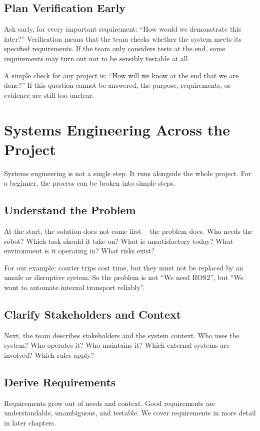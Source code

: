 \subsection{Plan Verification Early}
Ask early, for every important requirement: \enquote{How would we demonstrate this later?} Verification means that the team checks whether the system meets its specified requirements. If the team only considers tests at the end, some requirements may turn out not to be sensibly testable at all.

\begin{hinweisbox}
A simple check for any project is: \enquote{How will we know at the end that we are done?} If this question cannot be answered, the purpose, requirements, or evidence are still too unclear.
\end{hinweisbox}

\section{Systems Engineering Across the Project}
Systems engineering is not a single step. It runs alongside the whole project. For a beginner, the process can be broken into simple steps.

\subsection{Understand the Problem}
At the start, the solution does not come first -- the problem does. Who needs the robot? Which task should it take on? What is unsatisfactory today? What environment is it operating in? What risks exist?

For our example: courier trips cost time, but they must not be replaced by an unsafe or disruptive system. So the problem is not \enquote{We need ROS2}, but \enquote{We want to automate internal transport reliably}.

\subsection{Clarify Stakeholders and Context}
Next, the team describes stakeholders and the system context. Who uses the system? Who operates it? Who maintains it? Which external systems are involved? Which rules apply?

\subsection{Derive Requirements}
Requirements grow out of needs and context. Good requirements are understandable, unambiguous, and testable. We cover requirements in more detail in later chapters.

